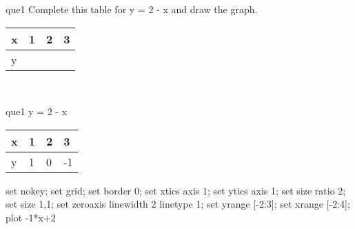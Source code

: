 \documentclass[13.5pt, varwidth=true]{beamer}
\begin{document}
\begin{frame}[shrink=19,fragile]
	\begin{beamercolorbox}[rounded=true, left, shadow=true,wd=14.8cm]{que1}
		 Complete this table for y = 2 - x and draw the graph. \\[0.3cm] \renewcommand{\arraystretch}{1.2}\begin{tabular}{|C|C|C|C|} \hline x & 1 & 2 & 3 \\ \hline y & & & \\ \hline \end{tabular}\\[0.3cm]
	\end{beamercolorbox}
\end{frame}
\begin{frame}[shrink=19,fragile]
	\begin{beamercolorbox}[rounded=true, left, shadow=true,wd=14.8cm]{que1}
		y = 2 - x\renewcommand{\arraystretch}{1.2}\begin{tabular}{|C|C|C|C|} \hline x & 1 & 2 & 3 \\ \hline y & 1 & 0 & -1\\ \hline \end{tabular}\begin{gnuplot}[terminal=pdf] set nokey; set grid; set border 0; set xtics axis 1; set ytics axis 1; set size ratio 2; set size 1,1; set zeroaxis linewidth 2 linetype 1; set yrange [-2:3]; set xrange [-2:4]; plot -1*x+2 \end{gnuplot}
	\end{beamercolorbox}
\end{frame}
\end{document}
